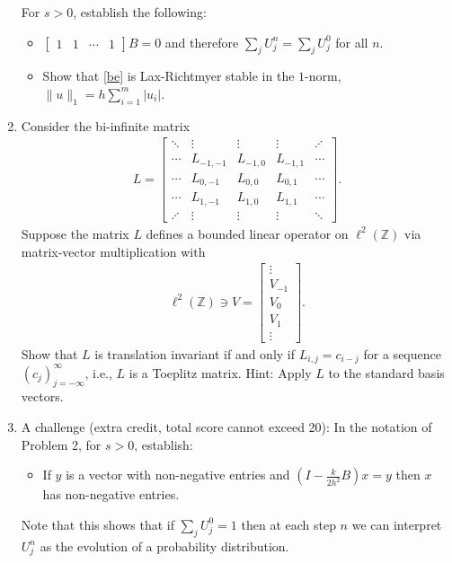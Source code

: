 \documentclass[10pt]{amsart}
\begin{document}
\begin{enumerate}[label={\bf Problem~{\arabic*}:}]
  
      \noindent For $s > 0$, establish the following:
       \begin{itemize}
       \item $\begin{bmatrix} 1 & 1 & \cdots & 1 \end{bmatrix} B = 0$ and therefore $\sum_j U_j^n = \sum_j U_j^0$ for all $n$.
         \item  Show that \eqref{be} is Lax-Richtmyer stable in the $1$-norm, $\|u\|_1 = h \sum_{i=1}^m |u_i|$.
    \end{itemize}
     
    \mline
    \item Consider the bi-infinite matrix
    \begin{align*}
      L = \begin{bmatrix}
        \ddots & \vdots & \vdots & \vdots  & \iddots \\
        \cdots & L_{-1,-1} & L_{-1,0} & L_{-1,1} & \cdots \\
        \cdots & L_{0,-1} & L_{0,0} & L_{0,1} & \cdots \\
        \cdots & L_{1,-1} & L_{1,0} & L_{1,1} & \cdots \\
        \iddots & \vdots & \vdots & \vdots & \ddots
      \end{bmatrix}.                
    \end{align*}
    Suppose the matrix $L$ defines a bounded linear operator on $\ell^2(\mathbb Z)$ via matrix-vector multiplication with
    \begin{align*}
     \ell^2(\mathbb Z) \ni V = \begin{bmatrix} \vdots \\ V_{-1} \\ V_0 \\ V_1 \\\vdots \end{bmatrix}.
    \end{align*}
    Show that $L$ is translation invariant if and only if $L_{i,j} = c_{i - j}$ for a sequence $(c_j)_{j=-\infty}^\infty$, i.e., $L$ is a Toeplitz matrix.  Hint: Apply $L$ to the standard basis vectors.

    
\mline 
  
\item A challenge (extra credit, total score cannot exceed 20):  In the notation of Problem 2, for $s > 0$, establish:
  \begin{itemize}
  \item If $y$ is a vector with non-negative entries and $\left( I - \frac{k}{2h^2}B \right) x = y$ then $x$ has non-negative entries.
  \end{itemize}
  Note that this shows that if $\sum_j U_j^0 =1$ then at each step $n$ we can interpret $U_j^n$ as the evolution of a probability distribution.
    
  
  
    
  \end{enumerate}
\end{document}
